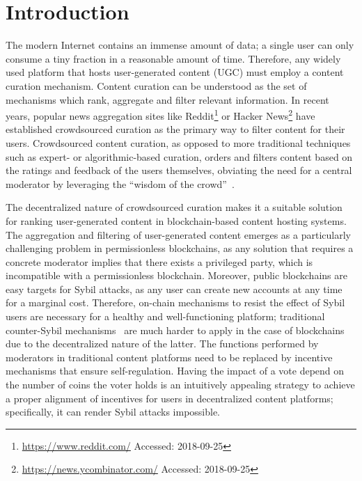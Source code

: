 \section{Introduction}
  The modern Internet contains an immense amount of data; a single user can only consume a tiny fraction in a reasonable amount of time. Therefore, any widely used platform that hosts user-generated content (UGC) must employ a content curation mechanism.
   Content curation can be understood as the set of mechanisms which rank, aggregate and filter relevant information. In recent years, popular news aggregation sites like Reddit\footnote{\url{https://www.reddit.com/} Accessed: 2018-09-25} or Hacker News\footnote{\url{https://news.ycombinator.com/} Accessed: 2018-09-25} have established crowdsourced curation as the primary way to filter content for their users.
   Crowdsourced content curation, as opposed to more traditional techniques such as expert- or algorithmic-based curation, orders and filters content based on the ratings and feedback of the users themselves, obviating the need for a central moderator by leveraging the ``wisdom of the crowd''~\cite{askalidis2013theoretical}.

  The decentralized nature of crowdsourced curation makes it a suitable solution for ranking user-generated content in blockchain-based content hosting systems. The aggregation and filtering of user-generated content emerges as a particularly challenging problem in permissionless blockchains, as any solution that requires a concrete moderator implies that there exists a privileged party, which is incompatible with a permissionless blockchain.
   Moreover, public blockchains are easy targets for Sybil attacks, as any user can create new accounts at any time for a marginal cost.
    Therefore, on-chain mechanisms to resist the effect of Sybil users are necessary for a healthy and well-functioning platform; traditional counter-Sybil mechanisms~\cite{levine2006survey} are much harder to apply in the case of blockchains due to the decentralized nature of the latter.
   The functions performed by moderators in traditional content platforms need to be replaced by incentive mechanisms that ensure self-regulation. Having the impact of a vote depend on the number of coins the voter holds is an intuitively appealing strategy to achieve a proper alignment of incentives for users in decentralized content platforms; specifically, it can render Sybil attacks impossible.
   
